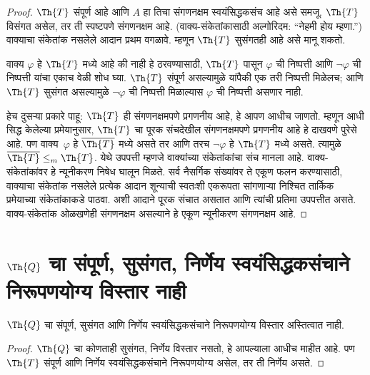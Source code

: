 \begin{proof}
$\Th{T}$ संपूर्ण आहे आणि $A$ हा तिचा संगणनक्षम स्वयंसिद्धकसंच
आहे असे समजू. $\Th{T}$ विसंगत असेल, तर ती स्पष्टपणे संगणनक्षम
आहे. (वाक्य-संकेतांकासाठी अल्गोरिदम: ``नेहमी होय म्हणा.'')
वाक्याचा संकेतांक नसलेले आदान प्रथम वगळावे. म्हणून $\Th{T}$
सुसंगतही आहे असे मानू शकतो.

वाक्य $\varphi$ हे $\Th{T}$ मध्ये आहे की नाही हे ठरवण्यासाठी,
$\Th{T}$ पासून $\varphi$ ची निष्पत्ती आणि
$\lnot \varphi$ ची निष्पत्ती यांचा एकाच वेळी शोध घ्या.
$\Th{T}$ संपूर्ण असल्यामुळे यांपैकी एक तरी निष्पत्ती मिळेलच;
आणि $\Th{T}$ सुसंगत असल्यामुळे $\lnot \varphi$ ची
निष्पत्ती मिळाल्यास $\varphi$ ची निष्पत्ती असणार नाही.

हेच दुसऱ्या प्रकारे पाहू: $\Th{T}$ ही संगणनक्षमपणे प्रगणनीय आहे, हे आपण
आधीच जाणतो. म्हणून आधी सिद्ध केलेल्या प्रमेयानुसार,
$\Th{T}$ चा पूरक संचदेखील संगणनक्षमपणे प्रगणनीय आहे हे दाखवणे पुरेसे आहे.
पण वाक्य~$\varphi$ हे $\overline{\Th{T}}$ मध्ये असते तर आणि तरच $\lnot \varphi$ हे $\Th{T}$
मध्ये असते. त्यामुळे $\overline{\Th{T}} \leq_m
\Th{T}$.
येथे उपपत्ती म्हणजे वाक्यांच्या संकेतांकांचा संच मानला आहे.
वाक्य-संकेतांकांवर हे न्यूनीकरण निषेध घालून मिळते. सर्व नैसर्गिक
संख्यांवर ते एकूण फलन करण्यासाठी, वाक्याचा संकेतांक नसलेले
प्रत्येक आदान शून्याची स्वतःशी एकरूपता सांगणाऱ्या निश्चित
तार्किक प्रमेयाच्या संकेतांकाकडे पाठवा. अशी आदाने पूरक संचात
असतात आणि त्यांची प्रतिमा उपपत्तीत असते. वाक्य-संकेतांक
ओळखणेही संगणनक्षम असल्याने हे एकूण न्यूनीकरण संगणनक्षम आहे.
\end{proof}












\section[Q चा संपूर्ण, सुसंगत, निर्णेय स्वयंसिद्धकसंचाने निरूपणयोग्य विस्तार नाही]{$\Th{Q}$ चा संपूर्ण, सुसंगत, निर्णेय स्वयंसिद्धकसंचाने निरूपणयोग्य
  विस्तार नाही}\label{inc:tcp:inc:sec}

\begin{thm}
\label{inc:tcp:inc:thm:first-incompleteness}
$\Th{Q}$ चा संपूर्ण, सुसंगत आणि निर्णेय स्वयंसिद्धकसंचाने निरूपणयोग्य विस्तार
अस्तित्वात नाही.
\end{thm}

\begin{proof}
$\Th{Q}$ चा कोणताही सुसंगत, निर्णेय विस्तार नसतो, हे
आपल्याला आधीच माहीत आहे. पण $\Th{T}$ संपूर्ण आणि
निर्णेय स्वयंसिद्धकसंचाने निरूपणयोग्य असेल, तर ती निर्णेय असते.
\end{proof}

